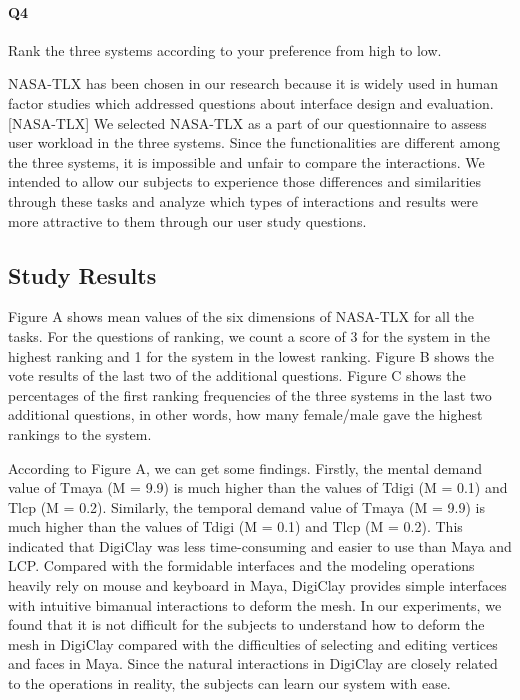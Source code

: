 \paragraph{Q4} Rank the three systems according to your preference from high to low.

NASA-TLX has been chosen in our research because it is widely used in human factor studies which addressed questions about interface design and evaluation.[NASA-TLX] We selected NASA-TLX as a part of our questionnaire to assess user workload in the three systems. Since the functionalities are different among the three systems, it is impossible and unfair to compare the interactions. We intended to allow our subjects to experience those differences and similarities through these tasks and analyze which types of interactions and results were more attractive to them through our user study questions.





\subsection{Study Results}
\label{sec:6.4}

Figure A shows mean values of the six dimensions of NASA-TLX for all the tasks. For the questions of ranking, we count a score of 3 for the system in the highest ranking and 1 for the system in the lowest ranking. Figure B shows the vote results of the last two of the additional questions. Figure C shows the percentages of the first ranking frequencies of the three systems in the last two additional questions, in other words, how many female/male gave the highest rankings to the system.

According to Figure A, we can get some findings. 
Firstly, the mental demand value of Tmaya (M = 9.9) is much higher than the values of Tdigi (M = 0.1) and Tlcp (M = 0.2). Similarly, the temporal demand value of Tmaya (M = 9.9) is much higher than the values of Tdigi (M = 0.1) and Tlcp (M = 0.2). This indicated that DigiClay was less time-consuming and easier to use than Maya and LCP.
Compared with the formidable interfaces and the modeling operations heavily rely on mouse and keyboard in Maya, DigiClay provides simple interfaces with intuitive bimanual interactions to deform the mesh. In our experiments, we found that it is not difficult for the subjects to understand how to deform the mesh in DigiClay compared with the difficulties of selecting and editing vertices and faces in Maya. Since the natural interactions in DigiClay are closely related to the operations in reality, the subjects can learn our system with ease.

